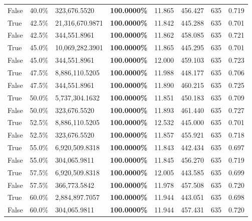 \begin{table}[H]
\begin{tabular}{lllrllll}
\cline{1-8}
False & 40.0\% & 323,676.5520 & \bfseries \color{red} 100.0000\% & 11.865 & 456.427 & 635 & 0.719 \\
\cline{1-8}
True & 42.5\% & 21,316,670.9871 & \bfseries \color{red} 100.0000\% & 11.842 & 445.288 & 635 & 0.701 \\
\cline{1-8}
False & 42.5\% & 344,551.8961 & \bfseries \color{red} 100.0000\% & 11.862 & 458.085 & 635 & 0.721 \\
\cline{1-8}
True & 45.0\% & 10,069,282.3901 & \bfseries \color{red} 100.0000\% & 11.865 & 445.295 & 635 & 0.701 \\
\cline{1-8}
False & 45.0\% & 344,551.8961 & \bfseries \color{red} 100.0000\% & 12.000 & 459.103 & 635 & 0.723 \\
\cline{1-8}
True & 47.5\% & 8,886,110.5205 & \bfseries \color{red} 100.0000\% & 11.988 & 448.177 & 635 & 0.706 \\
\cline{1-8}
False & 47.5\% & 344,551.8961 & \bfseries \color{red} 100.0000\% & 11.890 & 460.215 & 635 & 0.725 \\
\cline{1-8}
True & 50.0\% & 5,737,304.1632 & \bfseries \color{red} 100.0000\% & 11.851 & 450.183 & 635 & 0.709 \\
\cline{1-8}
False & 50.0\% & 323,676.5520 & \bfseries \color{red} 100.0000\% & 11.893 & 461.440 & 635 & 0.727 \\
\cline{1-8}
True & 52.5\% & 8,886,110.5205 & \bfseries \color{red} 100.0000\% & 12.532 & 445.000 & 635 & 0.701 \\
\cline{1-8}
False & 52.5\% & 323,676.5520 & \bfseries \color{red} 100.0000\% & 11.857 & 455.921 & 635 & 0.718 \\
\cline{1-8}
True & 55.0\% & 6,920,509.8318 & \bfseries \color{red} 100.0000\% & 11.843 & 442.434 & 635 & 0.697 \\
\cline{1-8}
False & 55.0\% & 304,065.9811 & \bfseries \color{red} 100.0000\% & 11.845 & 456.270 & 635 & 0.719 \\
\cline{1-8}
True & 57.5\% & 6,920,509.8318 & \bfseries \color{red} 100.0000\% & 12.005 & 443.585 & 635 & 0.699 \\
\cline{1-8}
False & 57.5\% & 366,773.5842 & \bfseries \color{red} 100.0000\% & 11.978 & 457.508 & 635 & 0.720 \\
\cline{1-8}
True & 60.0\% & 2,884,897.7057 & \bfseries \color{red} 100.0000\% & 11.944 & 443.051 & 635 & 0.698 \\
\cline{1-8}
False & 60.0\% & 304,065.9811 & \bfseries \color{red} 100.0000\% & 11.944 & 457.431 & 635 & 0.720 \\

\end{tabular}
\end{table}
